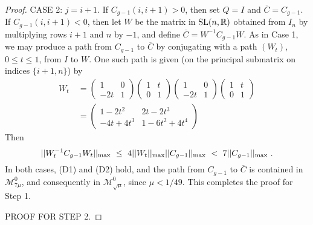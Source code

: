 \documentclass{amsart}
\theoremstyle{definition}
\theoremstyle{remark}
\numberwithin{equation}{section}
\begin{document}
{{\begin{proof}
CASE 2: $j=i+1$. If $C_{g-1}(i,i+1)>0$, then set $Q=I$ and 
$\overline C=C_{g-1}$. If $C_{g-1}(i,i+1)<0$, then 
let $W$ be the matrix 
in $\textnormal{SL}(n,\mathbb R)$ 
obtained from $I_n$ by 
multiplying rows $i+1$ and $n$ by $-1$, and 
define 
$\overline C=W^{-1}C_{g-1}W $. 
As in Case 1,  we may produce a path from 
$C_{g-1}$ to $\overline C$ by conjugating with a path 
$(W_t)$, $0\leq t\leq 1$, from $I$ to $W$.
One such path is given (on the principal submatrix 
on indices $\{i+1,n\}$) by 
\begin{align*} 
W_t \ 
&= 
\begin{pmatrix} 
1&0
\\ 
-2t&1
\end{pmatrix}
\begin{pmatrix} 
1&t
\\ 
0&1
\end{pmatrix}
\begin{pmatrix} 
1&0
\\ 
-2t&1
\end{pmatrix}
\begin{pmatrix} 
1&t
\\ 
0&1
\end{pmatrix}
\\
&=
\begin{pmatrix} 
1-2t^2 & 2t-2t^3 
\\ 
-4t +4t^3 & 1 - 6t^2 + 4t^4 
\end{pmatrix}
\end{align*} 
Then 
\[
||W_t^{-1}C_{g-1}W_t||_{\textnormal{max}} \ 
\leq \ 
4
||W_t||_{\textnormal{max}} 
||C_{g-1}||_{\textnormal{max}} \ 
 < \ 
7 ||C_{g-1}||_{\textnormal{max}} 
\ . 
\] 
In both cases, (D1) and (D2) hold,  
and the path from $C_{g-1}$ to $\overline C$ 
is contained in 
$\mathcal M^0_{7\mu}$, and consequently in    
$\mathcal M^0_{\sqrt{\mu}}$, since     
$\mu < 1/49$. 
This completes the proof for Step 1. 

PROOF FOR STEP 2. 


\end{proof}}}
\end{document}
